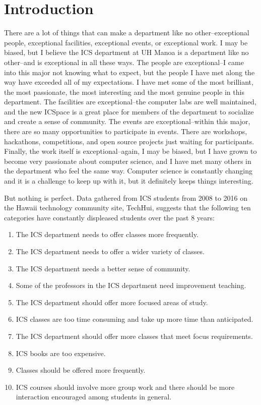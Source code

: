 \chapter{Introduction}
There are a lot of things that can make a department like no other--exceptional people, exceptional facilities, exceptional events, or exceptional work. I may be biased, but I believe the ICS department at UH Manoa is a department like no other--and is exceptional in all these ways. The people are exceptional--I came into this major not knowing what to expect, but the people I have met along the way have exceeded all of my expectations. I have met some of the most brilliant, the most passionate, the most interesting and the most genuine people in this department. The facilities are exceptional--the computer labs are well maintained, and the new ICSpace is a great place for members of the department to socialize and create a sense of community. The events are exceptional--within this major, there are so many opportunities to participate in events. There are workshops, hackathons, competitions, and open source projects just waiting for participants. Finally, the work itself is exceptional--again, I may be biased, but I have grown to become very passionate about computer science, and I have met many others in the department who feel the same way. Computer science is constantly changing and it is a challenge to keep up with it, but it definitely keeps things interesting.

But nothing is perfect. Data gathered from ICS students from 2008 to 2016 on the Hawaii technology community site, TechHui, suggests that the following ten categories have constantly displeased students over the past 8 years:

\begin{enumerate}
  \item The ICS department needs to offer classes more frequently.
  \item The ICS department needs to offer a wider variety of classes.
  \item The ICS department needs a better sense of community.
  \item Some of the professors in the ICS department need improvement teaching.
  \item The ICS department should offer more focused areas of study.
  \item ICS classes are too time consuming and take up more time than anticipated.
  \item The ICS department should offer more classes that meet focus requirements.
  \item ICS books are too expensive.
  \item Classes should be offered more frequently.
  \item ICS courses should involve more group work and there should be more interaction encouraged among students in general.
\end{enumerate}

